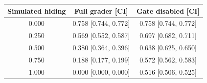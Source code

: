 \begin{tabular}{ccc}\toprule
Simulated hiding & Full grader [CI] & Gate disabled [CI] \\\midrule
0.000 & 0.758 [0.744, 0.772] & 0.758 [0.744, 0.772] \\
0.250 & 0.569 [0.552, 0.587] & 0.697 [0.682, 0.711] \\
0.500 & 0.380 [0.364, 0.396] & 0.638 [0.625, 0.650] \\
0.750 & 0.188 [0.177, 0.199] & 0.572 [0.562, 0.583] \\
1.000 & 0.000 [0.000, 0.000] & 0.516 [0.506, 0.525] \\\bottomrule
\end{tabular}
